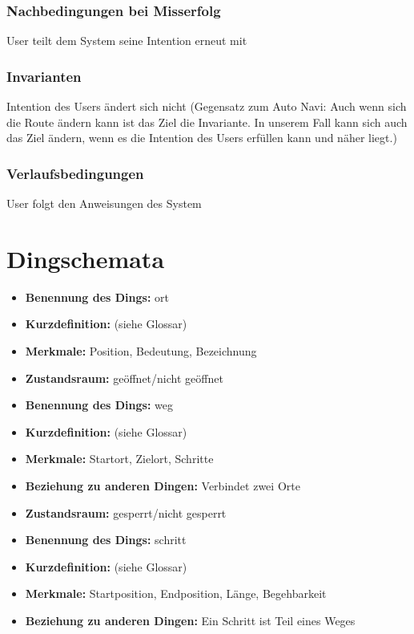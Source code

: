 \subsubsection*{Nachbedingungen bei Misserfolg} 
User teilt dem System seine Intention erneut mit 
\subsubsection*{Invarianten} 
Intention des Users ändert sich nicht (Gegensatz zum Auto Navi: Auch wenn sich die Route ändern kann ist das Ziel die Invariante. In unserem Fall kann sich auch das Ziel ändern, wenn es die Intention des Users erfüllen kann und näher liegt.) 
\subsubsection*{Verlaufsbedingungen} 
User folgt den Anweisungen des System 

\section{Dingschemata}

\begin{itemize}
\item \textbf{Benennung des Dings:} \Gls{ort}
\item \textbf{Kurzdefinition:} (siehe Glossar)
\item \textbf{Merkmale:} Position, Bedeutung, Bezeichnung
\item \textbf{Zustandsraum:} geöffnet/nicht geöffnet
\end{itemize}

\hrulefill

\begin{itemize}
\item \textbf{Benennung des Dings:} \Gls{weg}
\item \textbf{Kurzdefinition:} (siehe Glossar)
\item \textbf{Merkmale:} Startort, Zielort, Schritte
\item \textbf{Beziehung zu anderen Dingen:} Verbindet zwei Orte
\item \textbf{Zustandsraum:} gesperrt/nicht gesperrt
\end{itemize}

\hrulefill

\begin{itemize}
\item \textbf{Benennung des Dings:} \Gls{schritt}
\item \textbf{Kurzdefinition:} (siehe Glossar)
\item \textbf{Merkmale:} Startposition, Endposition, Länge, Begehbarkeit
\item \textbf{Beziehung zu anderen Dingen:} Ein Schritt ist Teil eines Weges
\end{itemize}

